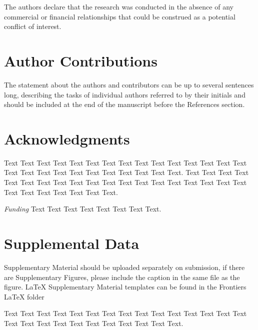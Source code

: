 \documentclass{frontiersSCNS} %
\begin{document}
The authors declare that the research was conducted in the absence of any commercial or financial relationships that could be construed as a potential conflict of interest.

\section*{Author Contributions}

The statement about the authors and contributors can be up to several sentences long, describing the tasks of individual authors referred to by their initials and should be included at the end of the manuscript before the References section.


\section*{Acknowledgments}
Text Text Text Text Text Text  Text Text Text Text Text Text Text Text  Text Text Text Text Text Text Text Text Text  Text Text Text. Text Text Text Text Text Text  Text Text Text Text Text Text Text Text  Text Text Text Text Text Text Text Text Text  Text Text Text. 


\textit{Funding\textcolon} Text Text Text Text Text Text  Text Text.

\section*{Supplemental Data}
Supplementary Material should be uploaded separately on submission, if there are Supplementary Figures, please include the caption in the same file as the figure. LaTeX Supplementary Material templates can be found in the Frontiers LaTeX folder

Text Text Text Text Text Text  Text Text Text Text Text Text Text Text  Text Text Text Text Text Text Text Text Text  Text Text Text.
\end{document}
